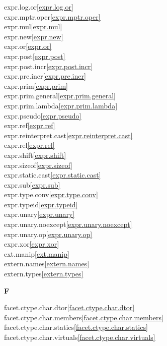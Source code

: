 \begin{multicols}{2}
expr.log.or\quad\ref{expr.log.or}\\
expr.mptr.oper\quad\ref{expr.mptr.oper}\\
expr.mul\quad\ref{expr.mul}\\
expr.new\quad\ref{expr.new}\\
expr.or\quad\ref{expr.or}\\
expr.post\quad\ref{expr.post}\\
expr.post.incr\quad\ref{expr.post.incr}\\
expr.pre.incr\quad\ref{expr.pre.incr}\\
expr.prim\quad\ref{expr.prim}\\
expr.prim.general\quad\ref{expr.prim.general}\\
expr.prim.lambda\quad\ref{expr.prim.lambda}\\
expr.pseudo\quad\ref{expr.pseudo}\\
expr.ref\quad\ref{expr.ref}\\
expr.reinterpret.cast\quad\ref{expr.reinterpret.cast}\\
expr.rel\quad\ref{expr.rel}\\
expr.shift\quad\ref{expr.shift}\\
expr.sizeof\quad\ref{expr.sizeof}\\
expr.static.cast\quad\ref{expr.static.cast}\\
expr.sub\quad\ref{expr.sub}\\
expr.type.conv\quad\ref{expr.type.conv}\\
expr.typeid\quad\ref{expr.typeid}\\
expr.unary\quad\ref{expr.unary}\\
expr.unary.noexcept\quad\ref{expr.unary.noexcept}\\
expr.unary.op\quad\ref{expr.unary.op}\\
expr.xor\quad\ref{expr.xor}\\
ext.manip\quad\ref{ext.manip}\\
extern.names\quad\ref{extern.names}\\
extern.types\quad\ref{extern.types}\\
\par \textbf{F}\par
facet.ctype.char.dtor\quad\ref{facet.ctype.char.dtor}\\
facet.ctype.char.members\quad\ref{facet.ctype.char.members}\\
facet.ctype.char.statics\quad\ref{facet.ctype.char.statics}\\
facet.ctype.char.virtuals\quad\ref{facet.ctype.char.virtuals}\\

\end{multicols}
